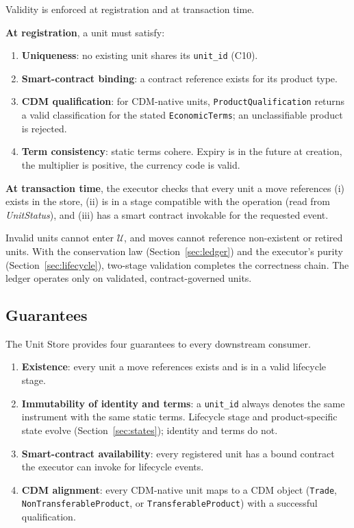 Validity is enforced at registration and at transaction time.

\noindent\textbf{At registration}, a unit must satisfy:
\begin{enumerate}[nosep]
\item \textbf{Uniqueness}: no existing unit shares its \texttt{unit\_id} (C10).
\item \textbf{Smart-contract binding}: a contract reference exists for its product type.
\item \textbf{CDM qualification}: for CDM-native units, \texttt{ProductQualification} returns a valid classification for the stated \texttt{EconomicTerms}; an unclassifiable product is rejected.
\item \textbf{Term consistency}: static terms cohere. Expiry is in the future at creation, the multiplier is positive, the currency code is valid.
\end{enumerate}

\noindent\textbf{At transaction time}, the executor checks that every unit a move references (i) exists in the store, (ii) is in a stage compatible with the operation (read from \emph{UnitStatus}), and (iii) has a smart contract invokable for the requested event.

Invalid units cannot enter $\mathcal{U}$, and moves cannot reference non-existent or retired units. With the conservation law (Section~\ref{sec:ledger}) and the executor's purity (Section~\ref{sec:lifecycle}), two-stage validation completes the correctness chain. The ledger operates only on validated, contract-governed units.

\subsection{Guarantees}

The Unit Store provides four guarantees to every downstream consumer.

\begin{enumerate}
\item \textbf{Existence}: every unit a move references exists and is in a valid lifecycle stage.
\item \textbf{Immutability of identity and terms}: a \texttt{unit\_id} always denotes the same instrument with the same static terms. Lifecycle stage and product-specific state evolve (Section~\ref{sec:states}); identity and terms do not.
\item \textbf{Smart-contract availability}: every registered unit has a bound contract the executor can invoke for lifecycle events.
\item \textbf{CDM alignment}: every CDM-native unit maps to a CDM object (\texttt{Trade}, \texttt{Non\allowbreak{}Transferable\allowbreak{}Product}, or \texttt{Transferable\allowbreak{}Product}) with a successful qualification.
\end{enumerate}

